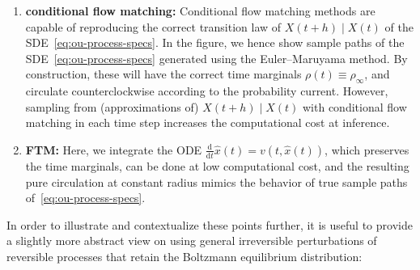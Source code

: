 \documentclass[oneside,11pt]{article}
\theoremstyle{remark}
\begin{document}
\begin{enumerate}
The resulting ODE $\tfrac{\mathrm{d}}{\mathrm{d}t}\hat{x}(t) = 0$ is trivial to integrate in this particular example, but more generally the velocity is not zero and thus time stepping with population dynamics can require more than one neural-network evaluation per time step  as in our experiments.
    \item \textbf{conditional flow matching:} Conditional flow matching methods are capable of reproducing the correct transition law of $X(t+h) \mid X(t)$ of the SDE~\eqref{eq:ou-process-specs}. In the figure, we hence show sample paths of the SDE~\eqref{eq:ou-process-specs} generated using the Euler--Maruyama method. By construction, these will have the correct time marginals $\rho(t) \equiv \rho_\infty$, and circulate counterclockwise according to the probability current. However, sampling from (approximations of) $X(t+h) \mid X(t)$ with conditional flow matching in each time step increases the computational cost at inference.
    \item \textbf{FTM:} Here, we integrate the ODE $\tfrac{\mathrm{d}}{\mathrm{d}t}\hat{x}(t) = v(t,\hat{x}(t))$, which preserves the time marginals, can be done at low computational cost, and the resulting pure circulation at constant radius mimics the behavior of true sample paths of~\eqref{eq:ou-process-specs}.
\end{enumerate}

In order to illustrate and contextualize these points further, it is useful to provide a slightly more abstract view on  using general irreversible perturbations of reversible processes that retain the Boltzmann equilibrium distribution:
\end{document}
